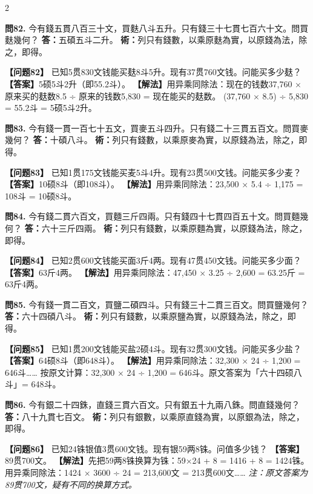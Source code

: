\documentclass[11pt,a4paper]{article}
\begin{document}
\begin{paracol}{2}
\switchcolumn*

\textbf{問82.} 今有錢五貫八百三十文，買麩八斗五升。只有錢三十七貫七百六十文。問買麩幾何？\break
\textbf{答：}五碩五斗二升。\break
\textbf{術：}列只有錢數，以乘原麩為實，以原錢為法，除之，即得。

\switchcolumn

\textbf{【问题82】} 已知5贯830文钱能买麸8斗5升。现有37贯760文钱。问能买多少麸？\break
\textbf{【答案】}5硕5斗2升（即55.2斗）。\break
\textbf{【解法】}用异乘同除法：现在的钱数37,760 × 原来买的麸数8.5 ÷ 原来的钱数5,830 = 现在能买的麸数。\break
(37,760 × 8.5) ÷ 5,830 = 55.2斗 = 5硕5斗2升。

\switchcolumn*

\textbf{問83.} 今有錢一貫一百七十五文，買麥五斗四升。只有錢二十三貫五百文。問買麥幾何？\break
\textbf{答：}十碩八斗。\break
\textbf{術：}列只有錢數，以乘原麥為實，以原錢為法，除之，即得。

\switchcolumn

\textbf{【问题83】} 已知1贯175文钱能买麦5斗4升。现有23贯500文钱。问能买多少麦？\break
\textbf{【答案】}10硕8斗（即108斗）。\break
\textbf{【解法】}用异乘同除法：23,500 × 5.4 ÷ 1,175 = 108斗 = 10硕8斗。

\switchcolumn*

\textbf{問84.} 今有錢二貫六百文，買麵三斤四兩。只有錢四十七貫四百五十文。問買麵幾何？\break
\textbf{答：}六十三斤四兩。\break
\textbf{術：}列只有錢數，以乘原麵為實，以原錢為法，除之，即得。

\switchcolumn

\textbf{【问题84】} 已知2贯600文钱能买面3斤4两。现有47贯450文钱。问能买多少面？\break
\textbf{【答案】}63斤4两。\break
\textbf{【解法】}用异乘同除法：47,450 × 3.25 ÷ 2,600 = 63.25斤 = 63斤4两。

\switchcolumn*

\textbf{問85.} 今有錢一貫二百文，買鹽二碩四斗。只有錢三十二貫三百文。問買鹽幾何？\break
\textbf{答：}六十四碩八斗。\break
\textbf{術：}列只有錢數，以乘原鹽為實，以原錢為法，除之，即得。

\switchcolumn

\textbf{【问题85】} 已知1贯200文钱能买盐2硕4斗。现有32贯300文钱。问能买多少盐？\break
\textbf{【答案】}64硕8斗（即648斗）。\break
\textbf{【解法】}用异乘同除法：32,300 × 24 ÷ 1,200 = 646斗……\break
按原文计算：32,300 × 24 ÷ 1,200 = 646斗。原文答案为「六十四硕八斗」= 648斗。

\switchcolumn*

\textbf{問86.} 今有銀二十四銖，直錢三貫六百文。只有銀五十九兩八銖。問直錢幾何？\break
\textbf{答：}八十九貫七百文。\break
\textbf{術：}列只有銀數，以乘原直錢為實，以原銀為法，除之，即得。

\switchcolumn

\textbf{【问题86】} 已知24铢银值3贯600文钱。现有银59两8铢。问值多少钱？\break
\textbf{【答案】}89贯700文。\break
\textbf{【解法】}先把59两8铢换算为铢：59×24 + 8 = 1416 + 8 = 1424铢。\break
用异乘同除法：1424 × 3600 ÷ 24 = 213,600文 = 213贯600文……\break
\textit{注：原文答案为89贯700文，疑有不同的换算方式。}

\end{paracol}
\end{document}
